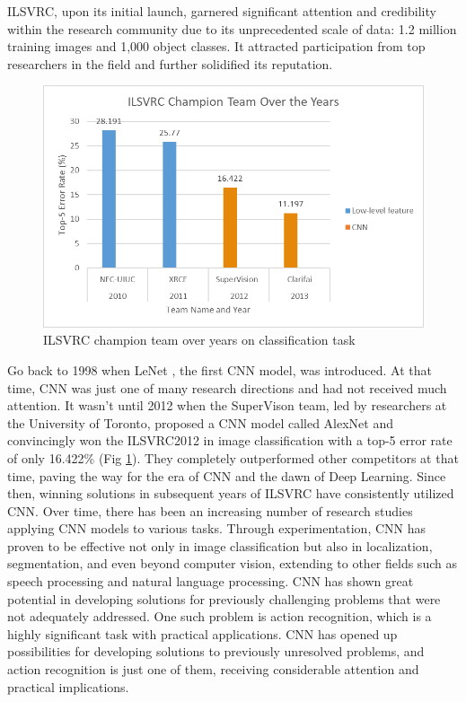 \documentclass[a4paper]{article}
\begin{document}
ILSVRC, upon its initial launch, garnered significant attention and credibility
within the research community due to its unprecedented scale of data: 1.2
million training images and 1,000 object classes. It attracted participation
from top researchers in the field and further solidified its reputation.

\begin{figure} [h]
	\centering
	
	\includegraphics[width=1.\linewidth]{fig_info/fig1/ILSVRCChampionTeamOvertheYears}
	\caption{ILSVRC champion team over years on classification task}
	\label{fig:ilsvrcchampionteamovertheyears}
\end{figure}

Go back to 1998 when LeNet \cite{LeNet}, the first CNN model, was introduced. At
that time, CNN was just one of many research directions and had not received
much attention. It wasn't until 2012 when the SuperVison team, led by
researchers at the University of Toronto, proposed a CNN model called AlexNet
and convincingly won the ILSVRC2012 in image classification with a top-5 error
rate of only 16.422\% (Fig \ref{fig:ilsvrcchampionteamovertheyears}). They
completely outperformed other competitors at that time, paving the way for the
era of CNN and the dawn of Deep Learning. Since then, winning solutions in
subsequent years of ILSVRC have consistently utilized CNN. Over time, there has
been an increasing number of research studies applying CNN models to various
tasks. Through experimentation, CNN has proven to be effective not only in image
classification but also in localization, segmentation, and even beyond computer
vision, extending to other fields such as speech processing and natural language
processing. CNN has shown great potential in developing solutions for previously
challenging problems that were not adequately addressed. One such problem is
action recognition, which is a highly significant task with practical
applications. CNN has opened up possibilities for developing solutions to
previously unresolved problems, and action recognition is just one of them,
receiving considerable attention and practical implications.
\end{document}
